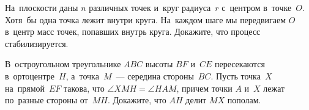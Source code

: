 \begin{problems}
\item
На~плоскости даны $n$ различных точек и~круг радиуса~$r$ с~центром в~точке~$O$.
Хотя~бы одна точка лежит внутри круга.
На~каждом шаге мы передвигаем $O$ в~центр масс точек, попавших внутрь круга.
Докажите, что процесс стабилизируется.

\item
В~остроугольном треугольнике $ABC$ высоты $BF$ и~$CE$ пересекаются
в~ортоцентре~$H$, а~точка~$M$~--- середина стороны~$BC$.
Пусть точка~$X$ на~прямой~$EF$ такова, что $\angle XMH = \angle HAM$, причем
точки $A$ и~$X$ лежат по~разные стороны от~$MH$.
Докажите, что $AH$ делит $MX$ пополам.

\end{problems}

